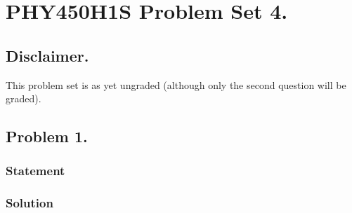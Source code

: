 
%

\chapter{PHY450H1S Problem Set 4.}
\label{chap:relElectroDynProblemSet4}
\date{Mar 3, 2011}

\beginArtWithToc

\section{Disclaimer.}

This problem set is as yet ungraded (although only the second question will be graded).

\section{Problem 1.}

\subsection{Statement}
\subsection{Solution}



\EndNoBibArticle
